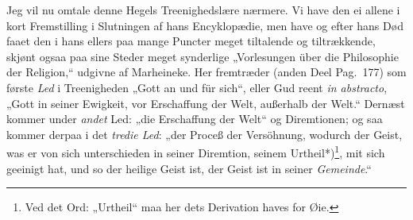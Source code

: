 \documentclass[12pt,a4paper]{book}
\newcommand{\apage}[1]{\marginnote{\footnotesize\textit{[#1]}}}
\begin{document}
Jeg vil nu omtale denne Hegels Treenighedslære nærmere. Vi have den ei allene i
kort Fremstilling i Slutningen af hans Encyklopædie, men have og efter hans Død
faaet den i hans ellers paa mange Puncter meget tiltalende og tiltrækkende,
skjønt ogsaa paa sine Steder meget synderlige „Vorlesungen über die Philosophie
der Religion,“ udgivne af Marheineke. Her fremtræder (anden Deel Pag.\ 177) som
første \emph{Led} i Treenigheden „Gott an und für sich“, eller Gud reent \textit{in
abstracto}, „Gott in seiner Ewigkeit, vor Erschaffung der Welt, außerhalb der
Welt.“ Dernæst kommer under \emph{andet} Led: „die Erschaffung der Welt“ og
Diremtionen; og saa kommer derpaa i det \emph{tredie Led}: „der Proceß der Versöhnung,
wodurch der Geist, was er von sich unterschieden in seiner Diremtion, seinem
Urtheil*)\footnote{Ved det Ord: „Urtheil“ maa her dets Derivation haves for
Øie.}, mit \apage{140} sich geeinigt hat, und so der heilige Geist ist, der Geist ist in
seiner \emph{Gemeinde}.“
\end{document}
